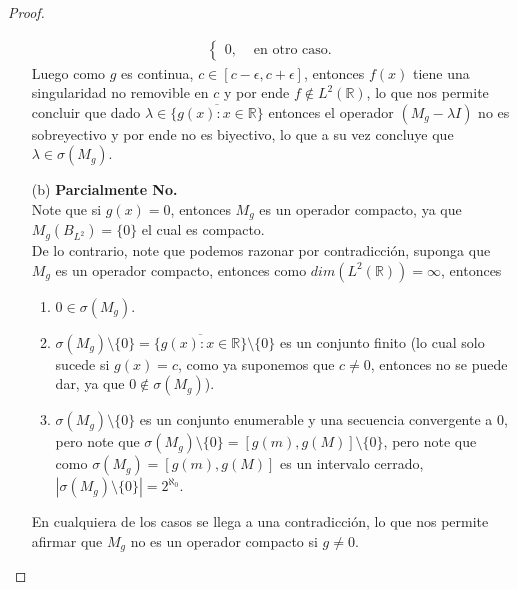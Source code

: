 \begin{proof}
\begin{enumerate}
\begin{align*}
\begin{cases}
          0, &\text{ en otro caso}.
        \end{cases}
      \end{align*}
      Luego como $g$ es continua, $c\in [c-\epsilon,c+\epsilon]$, entonces $f(x)$ tiene una singularidad no removible en $c$ y por ende $f\notin L^2(\mathbb{R})$, lo que nos permite concluir que dado $\lambda\in \overline{\{g(x):x\in\mathbb{R}\}}$ entonces el operador $(M_{g}-\lambda I)$ no es sobreyectivo y por ende no es biyectivo, lo que a su vez concluye que $\lambda\in \sigma(M_{g})$. 
    \item[(b)]
      \textbf{Parcialmente No.}\\
      Note que si $g(x)=0$, entonces $M_{g}$ es un operador compacto, ya que $M_{g}(B_{L^2})=\{0\}$ el cual es compacto.\\
      De lo contrario, note que podemos razonar por contradicción, suponga que $M_{g}$ es un operador compacto, entonces como $dim(L^2(\mathbb{R}))=\infty$, entonces
      \begin{enumerate}
        \item $0\in \sigma(M_{g})$.
        \item $\sigma(M_{g})\setminus \{0\}=\overline{\{g(x):x\in\mathbb{R}\}}\setminus \{0\}$ es un conjunto finito (lo cual solo sucede si $g(x)=c$, como ya suponemos que $c\neq 0$, entonces no se puede dar, ya que $0\notin \sigma(M_{g})$).
        \item $\sigma(M_{g})\setminus \{0\}$ es un conjunto enumerable y una secuencia convergente a $0$, pero note que $\sigma(M_{g})\setminus \{0\}=[g(m),g(M)]\setminus \{0\}$, pero note que como $\sigma(M_{g})=[g(m),g(M)]$ es un intervalo cerrado, $|\sigma(M_{g})\setminus \{0\}|=2^{\aleph_{0}}$.
      \end{enumerate}
      En cualquiera de los casos se llega a una contradicción, lo que nos permite afirmar que $M_{g}$ no es un operador compacto si $g\neq 0$. 
       
  \end{enumerate}
\end{proof}
